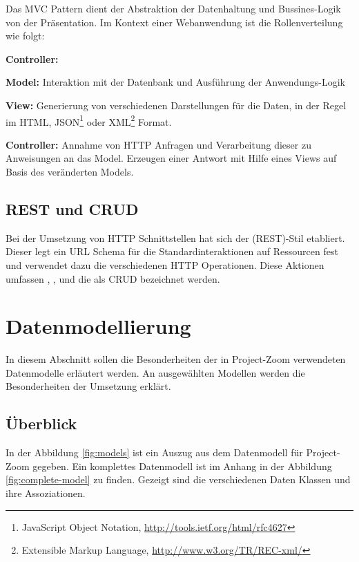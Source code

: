 Das MVC Pattern dient der Abstraktion der Datenhaltung und Bussines-Logik von der Präsentation. Im Kontext einer Webanwendung ist die Rollenverteilung wie folgt:
\begin{labeling}{\textbf{Controller:}}
\item[\textbf{Model:}] Interaktion mit der Datenbank und Ausführung der Anwendungs-Logik
\item[\textbf{View:}] Generierung von verschiedenen Darstellungen für die Daten, in der Regel im HTML, JSON\footnote{JavaScript Object Notation, \url{http://tools.ietf.org/html/rfc4627}} oder XML\footnote{Extensible Markup Language, \url{http://www.w3.org/TR/REC-xml/}} Format.
\item[\textbf{Controller:}] Annahme von HTTP Anfragen und  Verarbeitung dieser zu Anweisungen an das Model. Erzeugen einer Antwort mit Hilfe eines Views auf Basis des veränderten Models.
\end{labeling}

\subsection{REST und CRUD}

Bei der Umsetzung von HTTP Schnittstellen hat sich der  (REST)-Stil etabliert. Dieser legt ein URL Schema für die Standardinteraktionen auf Ressourcen fest und verwendet dazu die verschiedenen HTTP Operationen. Diese Aktionen umfassen , ,  und  die als CRUD bezeichnet werden.


\section{Datenmodellierung}
\label{sec:model}
In diesem Abschnitt sollen die Besonderheiten der in Project-Zoom verwendeten Datenmodelle erläutert werden. An ausgewählten Modellen werden die Besonderheiten der Umsetzung erklärt.

\subsection{Überblick}

In der Abbildung \ref{fig:models} ist ein Auszug aus dem Datenmodell für Project-Zoom gegeben. Ein komplettes Datenmodell ist im Anhang in der Abbildung \ref{fig:complete-model} zu finden. Gezeigt sind die verschiedenen Daten Klassen und ihre Assoziationen. 

